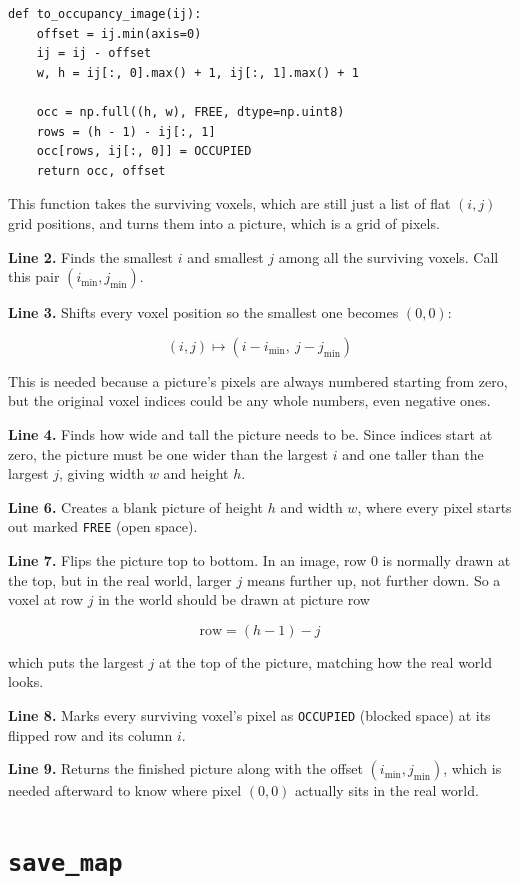 \documentclass[11pt]{article}
\begin{document}
\begin{lstlisting}
def to_occupancy_image(ij):
    offset = ij.min(axis=0)
    ij = ij - offset
    w, h = ij[:, 0].max() + 1, ij[:, 1].max() + 1

    occ = np.full((h, w), FREE, dtype=np.uint8)
    rows = (h - 1) - ij[:, 1]
    occ[rows, ij[:, 0]] = OCCUPIED
    return occ, offset
\end{lstlisting}

This function takes the surviving voxels, which are still just a list of flat $(i, j)$ grid positions, and turns them into a picture, which is a grid of pixels.

\textbf{Line 2.} Finds the smallest $i$ and smallest $j$ among all the surviving voxels. Call this pair $(i_{\min}, j_{\min})$.

\textbf{Line 3.} Shifts every voxel position so the smallest one becomes $(0, 0)$:

\[
(i, j) \mapsto (i - i_{\min},\ j - j_{\min})
\]

This is needed because a picture's pixels are always numbered starting from zero, but the original voxel indices could be any whole numbers, even negative ones.

\textbf{Line 4.} Finds how wide and tall the picture needs to be. Since indices start at zero, the picture must be one wider than the largest $i$ and one taller than the largest $j$, giving width $w$ and height $h$.

\textbf{Line 6.} Creates a blank picture of height $h$ and width $w$, where every pixel starts out marked \texttt{FREE} (open space).

\textbf{Line 7.} Flips the picture top to bottom. In an image, row $0$ is normally drawn at the top, but in the real world, larger $j$ means further up, not further down. So a voxel at row $j$ in the world should be drawn at picture row

\[
\text{row} = (h - 1) - j
\]

which puts the largest $j$ at the top of the picture, matching how the real world looks.

\textbf{Line 8.} Marks every surviving voxel's pixel as \texttt{OCCUPIED} (blocked space) at its flipped row and its column $i$.

\textbf{Line 9.} Returns the finished picture along with the offset $(i_{\min}, j_{\min})$, which is needed afterward to know where pixel $(0,0)$ actually sits in the real world.

\section{\texttt{save\_map}}
\end{document}
